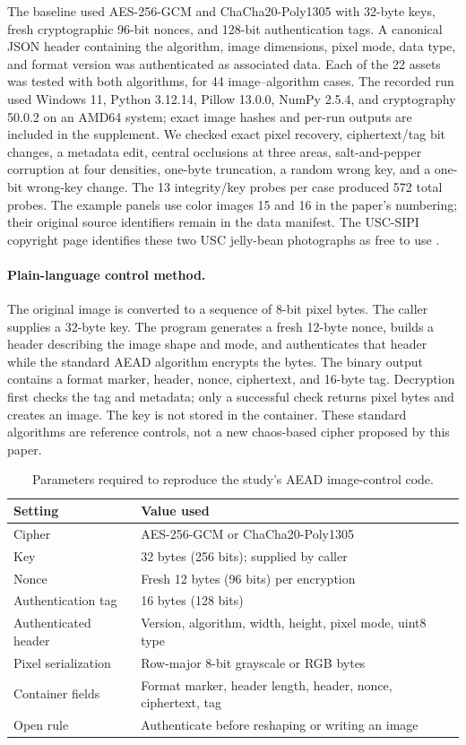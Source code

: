 \documentclass[letterpaper,journal]{IEEEtran}
\begin{document}
The baseline used AES-256-GCM and ChaCha20-Poly1305 with 32-byte keys, fresh cryptographic 96-bit nonces, and 128-bit authentication tags. A canonical JSON header containing the algorithm, image dimensions, pixel mode, data type, and format version was authenticated as associated data. Each of the 22 assets was tested with both algorithms, for 44 image--algorithm cases. The recorded run used Windows 11, Python 3.12.14, Pillow 13.0.0, NumPy 2.5.4, and cryptography 50.0.2 on an AMD64 system; exact image hashes and per-run outputs are included in the supplement. We checked exact pixel recovery, ciphertext/tag bit changes, a metadata edit, central occlusions at three areas, salt-and-pepper corruption at four densities, one-byte truncation, a random wrong key, and a one-bit wrong-key change. The 13 integrity/key probes per case produced 572 total probes. The example panels use color images 15 and 16 in the paper's numbering; their original source identifiers remain in the data manifest. The USC-SIPI copyright page identifies these two USC jelly-bean photographs as free to use \cite{uscSipiCopyright}.

\paragraph{Plain-language control method.} The original image is converted to a sequence of 8-bit pixel bytes. The caller supplies a 32-byte key. The program generates a fresh 12-byte nonce, builds a header describing the image shape and mode, and authenticates that header while the standard AEAD algorithm encrypts the bytes. The binary output contains a format marker, header, nonce, ciphertext, and 16-byte tag. Decryption first checks the tag and metadata; only a successful check returns pixel bytes and creates an image. The key is not stored in the container. These standard algorithms are reference controls, not a new chaos-based cipher proposed by this paper.

\begin{table}[!t]
\caption{Parameters required to reproduce the study's AEAD image-control code.}
\label{tab:control-parameters}
\centering\small
\begin{tabular}{p{}p{}}
\toprule
Setting & Value used \\
\midrule
Cipher & AES-256-GCM or ChaCha20-Poly1305 \\
Key & 32 bytes (256 bits); supplied by caller \\
Nonce & Fresh 12 bytes (96 bits) per encryption \\
Authentication tag & 16 bytes (128 bits) \\
Authenticated header & Version, algorithm, width, height, pixel mode, uint8 type \\
Pixel serialization & Row-major 8-bit grayscale or RGB bytes \\
Container fields & Format marker, header length, header, nonce, ciphertext, tag \\
Open rule & Authenticate before reshaping or writing an image \\
\bottomrule
\end{tabular}
\end{table}
\end{document}
